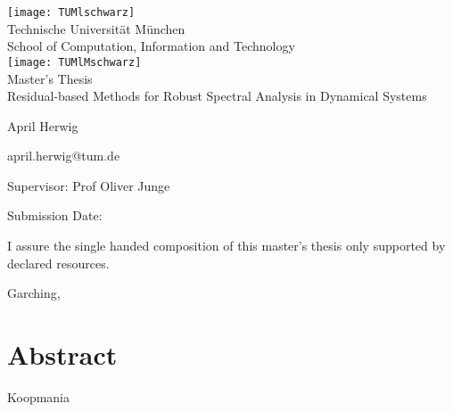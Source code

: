 \pagestyle{empty}
\begin{titlepage}
\begin{center}
\texttt{[image: TUMlschwarz]}\\[3mm]
\sf
{\Large
  Technische Universit\"at M\"unchen\\[5mm]
  School of Computation, Information and Technology\\[8mm]
}
\normalsize
\texttt{[image: TUMlMschwarz]}\\[15mm]

Master's Thesis\\[15mm]

{\LARGE
  Residual-based Methods for Robust Spectral Analysis in Dynamical Systems
}
\bigskip

\normalsize

April Herwig

april.herwig@tum.de
\end{center}
\vspace*{75mm}

Supervisor: Prof Oliver Junge
\medskip

Submission Date:  %

\end{titlepage}

\vspace*{150mm}

I assure the single handed composition of this master's thesis only supported by declared resources.
\bigskip

Garching, %
\newpage

\section*{Abstract}

Koopmania
